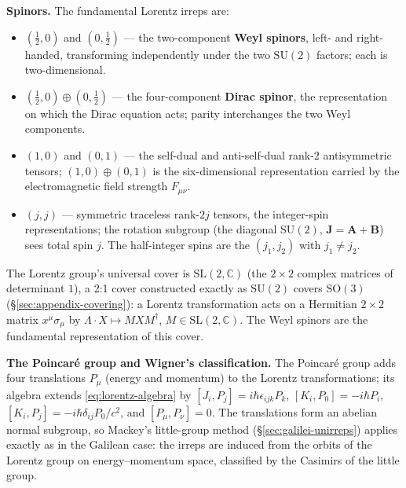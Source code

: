 \medskip\noindent\textbf{Spinors.} The fundamental Lorentz irreps are:
\begin{itemize}
\item $(\tfrac12,0)$ and $(0,\tfrac12)$ --- the two-component \textbf{Weyl spinors}, left- and right-handed, transforming independently under the two $\mathrm{SU}(2)$ factors; each is two-dimensional.
\item $(\tfrac12,0)\oplus(0,\tfrac12)$ --- the four-component \textbf{Dirac spinor}, the representation on which the Dirac equation acts; parity interchanges the two Weyl components.
\item $(1,0)$ and $(0,1)$ --- the self-dual and anti-self-dual rank-2 antisymmetric tensors; $(1,0)\oplus(0,1)$ is the six-dimensional representation carried by the electromagnetic field strength $F_{\mu\nu}$.
\item $(j,j)$ --- symmetric traceless rank-$2j$ tensors, the integer-spin representations; the rotation subgroup (the diagonal $\mathrm{SU}(2)$, $\bm J=\bm A+\bm B$) sees total spin $j$. The half-integer spins are the $(j_{1},j_{2})$ with $j_{1}\ne j_{2}$.
\end{itemize}
The Lorentz group's universal cover is $\mathrm{SL}(2,\mathbb C)$ (the $2\times2$ complex matrices of determinant $1$), a 2:1 cover constructed exactly as $\mathrm{SU}(2)$ covers $\mathrm{SO}(3)$ (\S\ref{sec:appendix-covering}): a Lorentz transformation acts on a Hermitian $2\times2$ matrix $x^{\mu}\sigma_{\mu}$ by $\Lambda\!\cdot\! X\mapsto M X M^{\dagger}$, $M\in\mathrm{SL}(2,\mathbb C)$. The Weyl spinors are the fundamental representation of this cover.

\medskip\noindent\textbf{The Poincar\'e group and Wigner's classification.} The Poincar\'e group adds four translations $P_{\mu}$ (energy and momentum) to the Lorentz transformations; its algebra extends \eqref{eq:lorentz-algebra} by $[J_{i},P_{j}]=i\hbar\epsilon_{ijk}P_{k}$, $[K_{i},P_{0}]=-i\hbar P_{i}$, $[K_{i},P_{j}]=-i\hbar\delta_{ij}P_{0}/c^{2}$, and $[P_{\mu},P_{\nu}]=0$. The translations form an abelian normal subgroup, so Mackey's little-group method (\S\ref{sec:galilei-unirreps}) applies exactly as in the Galilean case: the irreps are induced from the orbits of the Lorentz group on energy--momentum space, classified by the Casimirs of the little group.

